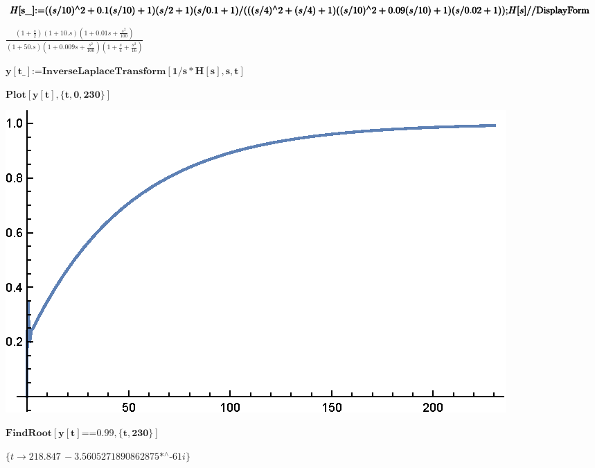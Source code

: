 \documentclass{article}
\begin{document}
\begin{doublespace}
\noindent\(\pmb{H[\text{s$\_$}]\text{:=}((s/10){}^{\wedge}2+0.1(s/10)+1)(s/2+1)(s/0.1+1)/(((s/4){}^{\wedge}2+(s/4)+1)((s/10){}^{\wedge}2+0.09(s/10)+1)(s/0.02+1));}\\
\pmb{H[s]\text{//}\text{DisplayForm}}\)
\end{doublespace}

\begin{doublespace}
\noindent\(\frac{\left(1+\frac{s}{2}\right) (1+10. s) \left(1+0.01 s+\frac{s^2}{100}\right)}{(1+50. s) \left(1+0.009 s+\frac{s^2}{100}\right) \left(1+\frac{s}{4}+\frac{s^2}{16}\right)}\)
\end{doublespace}

\begin{doublespace}
\noindent\(\pmb{y[\text{t$\_$}]\text{:=}\text{InverseLaplaceTransform}[1/s*H[s],s,t]}\)
\end{doublespace}

\begin{doublespace}
\noindent\(\pmb{\text{Plot}[y[t],\{t,0,230\}]}\)
\end{doublespace}

\includegraphics{pset1_gr1.eps}

\begin{doublespace}
\noindent\(\pmb{\text{FindRoot}[y[t]\text{==}0.99,\{t,230\}]}\)
\end{doublespace}

\begin{doublespace}
\noindent\(\{t\to 218.847\, -\text{3.5605271890862875$\grave{ }$*${}^{\wedge}$-61} i\}\)
\end{doublespace}
\end{document}

